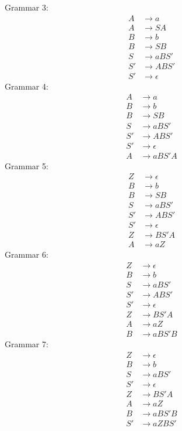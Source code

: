 \documentclass[11pt]{article}
\begin{document}
Grammar 3:
\setcounter{equation}{0}
\begin{align}
A &\rightarrow a\\
A &\rightarrow S A\\
B &\rightarrow b\\
B &\rightarrow S B\\
S &\rightarrow a B S'\\
S' &\rightarrow A B S'\\
S' &\rightarrow \epsilon
\end{align}
Grammar 4:
\setcounter{equation}{0}
\begin{align}
A &\rightarrow a\\
B &\rightarrow b\\
B &\rightarrow S B\\
S &\rightarrow a B S'\\
S' &\rightarrow A B S'\\
S' &\rightarrow \epsilon\\
A &\rightarrow a B S' A
\end{align}
Grammar 5:
\setcounter{equation}{0}
\begin{align}
Z &\rightarrow \epsilon\\
B &\rightarrow b\\
B &\rightarrow S B\\
S &\rightarrow a B S'\\
S' &\rightarrow A B S'\\
S' &\rightarrow \epsilon\\
Z &\rightarrow B S' A\\
A &\rightarrow a Z
\end{align}
Grammar 6:
\setcounter{equation}{0}
\begin{align}
Z &\rightarrow \epsilon\\
B &\rightarrow b\\
S &\rightarrow a B S'\\
S' &\rightarrow A B S'\\
S' &\rightarrow \epsilon\\
Z &\rightarrow B S' A\\
A &\rightarrow a Z\\
B &\rightarrow a B S' B
\end{align}
Grammar 7:
\setcounter{equation}{0}
\begin{align}
Z &\rightarrow \epsilon\\
B &\rightarrow b\\
S &\rightarrow a B S'\\
S' &\rightarrow \epsilon\\
Z &\rightarrow B S' A\\
A &\rightarrow a Z\\
B &\rightarrow a B S' B\\
S' &\rightarrow a Z B S'
\end{align}
\end{document}
